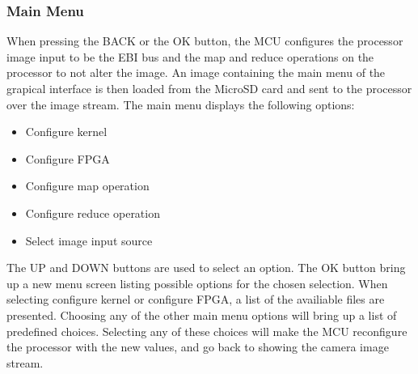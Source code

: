 \subsubsection{Main Menu}
When pressing the BACK or the OK button, the MCU configures the processor image input to be the EBI bus and the map and reduce operations on the processor to not alter the image. An image containing the main menu of the grapical interface is then loaded from the MicroSD card and sent to the processor over the image stream. The main menu displays the following options:

\begin{itemize}
	\item Configure kernel
	\item Configure FPGA
	\item Configure map operation
	\item Configure reduce operation
	\item Select image input source
\end{itemize}

The UP and DOWN buttons are used to select an option. The OK button bring up a new menu screen listing possible options for the chosen selection. When selecting configure kernel or configure FPGA, a list of the availiable files are presented. Choosing any of the other main menu options will bring up a list of predefined choices. Selecting any of these choices will make the MCU reconfigure the processor with the new values, and go back to showing the camera image stream.


